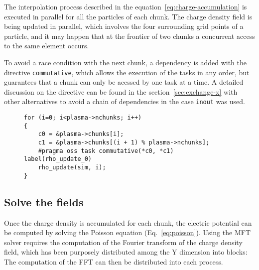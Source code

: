 %
The interpolation process described in the equation~\ref{eq:charge-accumulation} 
is executed in parallel for all the particles of each chunk. The charge density 
field is being updated in parallel, which involves the four surrounding grid 
points of a particle, and it may happen that at the frontier of two chunks a 
concurrent access to the same element occurs.

To avoid a race condition with the next chunk, a dependency is added with the 
directive \texttt{commutative}, which allows the execution of the tasks in any 
order, but guarantees that a chunk can only be acessed by one task at a time. A 
detailed discussion on the directive can be found in the 
section~\ref{sec:exchange-x} with other alternatives to avoid a chain of 
dependencies in the case \texttt{inout} was used.

\begin{figure}[h]
\begin{lstlisting}[caption={Task to update $\rho$ field using the 
\texttt{commutative} directive}, captionpos=b]
for (i=0; i<plasma->nchunks; i++)
{
	c0 = &plasma->chunks[i];
	c1 = &plasma->chunks[(i + 1) % plasma->nchunks];
	#pragma oss task commutative(*c0, *c1) label(rho_update_0)
	rho_update(sim, i);
}
\end{lstlisting}
\end{figure}

\subsection{Solve the fields}

Once the charge density is accumulated for each chunk, the electric potential 
can be computed by solving the Poisson equation (Eq.~\ref{eq:poisson}).  Using 
the MFT solver requires the computation of the Fourier transform of the charge 
density field, which has been purposely distributed among the Y dimension into 
blocks: The computation of the FFT can then be distributed into each process.

